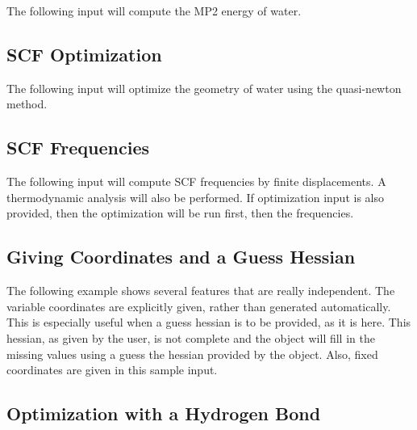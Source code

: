 The following input will compute the MP2 energy of water.



\subsection{SCF Optimization}

The following input will optimize the geometry of water using
the quasi-newton method.



\subsection{SCF Frequencies}

The following input will compute SCF frequencies by finite
displacements.  A thermodynamic analysis will also be
performed.  If optimization input is also provided, then the
optimization will be run first, then the frequencies.



\subsection{Giving Coordinates and a Guess Hessian}

The following example shows several features that are really independent.
The variable coordinates are explicitly given, rather than generated
automatically.  This is especially useful when a guess hessian is to be
provided, as it is here.  This hessian, as given by the user, is not
complete and the  object will fill in the missing
values using a guess the hessian provided by the 
object.  Also, fixed coordinates are given in this sample input.



\subsection{Optimization with a Hydrogen Bond}


